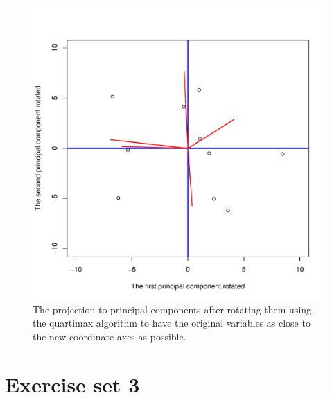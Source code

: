 \documentclass{article}
\begin{document}
\begin{figure}\centering
	\includegraphics[scale=\sscale]{qmax}
	\caption{The projection to principal components after rotating them using the quartimax algorithm to have the original variables as close to the new coordinate axes as possible.}\label{fig:qmax}
\end{figure}


\clearpage
\section{Exercise set 3}
\end{document}
